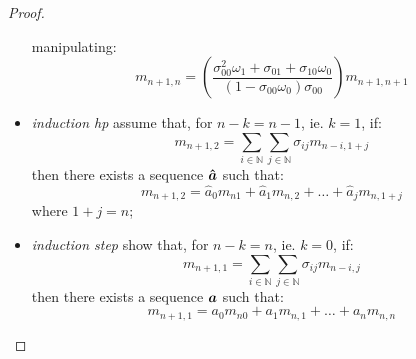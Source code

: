 \begin{proof}
\begin{itemize}
\begin{displaymath}
            \end{displaymath}
            manipulating:
            \begin{displaymath}
                m_{n+1,n}=
                    \left(\frac{\sigma_{00}^{2}\omega_{1}+\sigma_{01}+\sigma_{10}\omega_{0}}
                    {(1-\sigma_{00}\omega_{0})\sigma_{00}}\right)m_{n+1,n+1}
            \end{displaymath}
        \item \emph{induction hp} assume that, for $n-k=n-1$, ie. $k=1$, if:
            \begin{displaymath}
                m_{n+1,2}=\sum_{i\in\mathbb{N}}{\sum_{j\in\mathbb{N}}{\sigma_{ij}m_{n-i,1+j}}}
            \end{displaymath}
            then there exists a sequence $\boldsymbol{\hat{a}}$ such that:
            \begin{displaymath}
                m_{n+1,2}=\hat{a}_{0}m_{n1}+\hat{a}_{1}m_{n,2}+\ldots+\hat{a}_{j}m_{n,1+j}
            \end{displaymath}
            where $1+j=n$;
        \item \emph{induction step} show that, for $n-k=n$, ie. $k=0$, if:
            \begin{displaymath}
                m_{n+1,1}=\sum_{i\in\mathbb{N}}{\sum_{j\in\mathbb{N}}{\sigma_{ij}m_{n-i,j}}}
            \end{displaymath}
            then there exists a sequence $\boldsymbol{a}$ such that:
            \begin{displaymath}
                m_{n+1,1}=a_{0}m_{n0}+a_{1}m_{n,1}+\ldots+a_{n}m_{n,n}
            \end{displaymath}


\end{itemize}
\end{proof}

